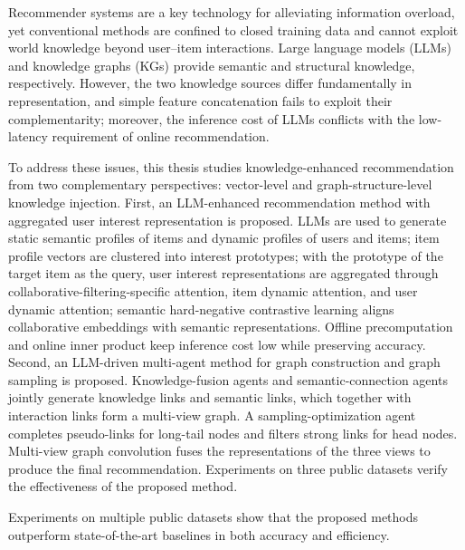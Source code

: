 \begin{abstract*}
  Recommender systems are a key technology for alleviating information overload, yet conventional methods are confined to closed training data and cannot exploit world knowledge beyond user--item interactions. Large language models (LLMs) and knowledge graphs (KGs) provide semantic and structural knowledge, respectively. However, the two knowledge sources differ fundamentally in representation, and simple feature concatenation fails to exploit their complementarity; moreover, the inference cost of LLMs conflicts with the low-latency requirement of online recommendation.

  To address these issues, this thesis studies knowledge-enhanced recommendation from two complementary perspectives: vector-level and graph-structure-level knowledge injection. First, an LLM-enhanced recommendation method with aggregated user interest representation is proposed. LLMs are used to generate static semantic profiles of items and dynamic profiles of users and items; item profile vectors are clustered into interest prototypes; with the prototype of the target item as the query, user interest representations are aggregated through collaborative-filtering-specific attention, item dynamic attention, and user dynamic attention; semantic hard-negative contrastive learning aligns collaborative embeddings with semantic representations. Offline precomputation and online inner product keep inference cost low while preserving accuracy. Second, an LLM-driven multi-agent method for graph construction and graph sampling is proposed. Knowledge-fusion agents and semantic-connection agents jointly generate knowledge links and semantic links, which together with interaction links form a multi-view graph. A sampling-optimization agent completes pseudo-links for long-tail nodes and filters strong links for head nodes. Multi-view graph convolution fuses the representations of the three views to produce the final recommendation. Experiments on three public datasets verify the effectiveness of the proposed method.

  Experiments on multiple public datasets show that the proposed methods outperform state-of-the-art baselines in both accuracy and efficiency.

\end{abstract*}
